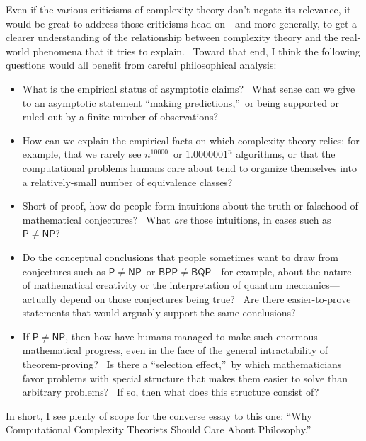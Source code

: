 \documentclass[11pt,onecolumn]{article}%
\begin{document}
Even if the various criticisms of complexity theory don't negate its
relevance, it would be great to address those criticisms head-on---and more
generally, to get a clearer understanding of the relationship between
complexity theory and the real-world phenomena that it tries to explain.
\ Toward that end, I think the following questions would all benefit from
careful philosophical analysis:

\begin{itemize}
\item What is the empirical status of asymptotic claims? \ What sense can we
give to an asymptotic statement \textquotedblleft making
predictions,\textquotedblright\ or being supported or ruled out by a finite
number of observations?

\item How can we explain the empirical facts on which complexity theory
relies: for example, that we rarely see $n^{10000}$\ or $1.0000001^{n}$
algorithms, or that the computational problems humans care about tend to
organize themselves into a relatively-small number of equivalence classes?

\item Short of proof, how do people form intuitions about the truth or
falsehood of mathematical conjectures? \ What \textit{are} those intuitions,
in cases such as $\mathsf{P}\neq\mathsf{NP}$?

\item Do the conceptual conclusions that people sometimes want to draw from
conjectures such as $\mathsf{P}\neq\mathsf{NP}$\ or $\mathsf{BPP}%
\neq\mathsf{BQP}$---for example, about the nature of mathematical creativity
or the interpretation of quantum mechanics---actually depend on those
conjectures being true? \ Are there easier-to-prove statements that would
arguably support the same conclusions?

\item If $\mathsf{P}\neq\mathsf{NP}$, then how have humans managed to make
such enormous mathematical progress, even in the face of the general
intractability of theorem-proving? \ Is there a \textquotedblleft selection
effect,\textquotedblright\ by which mathematicians favor problems with special
structure that makes them easier to solve than arbitrary problems? \ If so,
then what does this structure consist of?
\end{itemize}

In short, I see plenty of scope for the converse essay to this one:
\textquotedblleft Why Computational Complexity Theorists Should Care About
Philosophy.\textquotedblright
\end{document}
